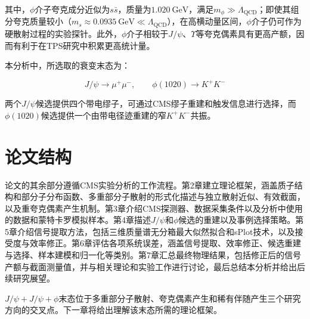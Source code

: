 其中，$\phi$介子夸克成分近似为$s\bar{s}$，质量为$\SI{1.020}{\giga\eV}$，满足$m_{\phi} \gg \Lambda_{\mathrm{QCD}}$；即使其组分夸克质量较小（$m_{s} \approx \SI{0.0935}{\giga\eV} \ll \Lambda_{\mathrm{QCD}}$），在高横动量区间，$\phi$介子仍可作为硬散射过程的实验探针。此外，$\phi$介子相较于$J/\psi$、$\Upsilon$等夸克偶素具有更高产额，因而有利于在TPS研究中积累更高统计量。

本分析中，所选取的衰变末态为：

\begin{equation*}
    J/\psi \to \mu^+\mu^-,
    \qquad
    \phi(1020) \to K^+K^-
\end{equation*}

两个$J/\psi$候选提供四个带电缪子，可通过CMS缪子重建和触发信息进行选择，而$\phi(1020)$候选提供一个由带电径迹重建的窄$K^+K^-$共振。

\section{论文结构}


论文的其余部分遵循CMS实验分析的工作流程。第2章建立理论框架，涵盖质子结构和部分子分布函数、多重部分子散射的形式化描述与独立散射近似、有效截面，以及重夸克偶素产生机制。第3章介绍CMS探测器、数据采集条件以及分析中使用的数据和蒙特卡罗模拟样本。第4章描述$J/\psi$和$\phi$候选的重建以及事例选择策略。第5章介绍信号提取方法，包括三维质量谱无分箱最大似然拟合和sPlot技术，以及接受度与效率修正。第6章评估各项系统误差，涵盖信号提取、效率修正、候选重建与选择、样本建模和归一化等类别。第7章汇总最终物理结果，包括修正后的信号产额与截面测量值，并与相关理论和实验工作进行讨论，最后总结本分析并给出后续研究展望。

$J/\psi+J/\psi+\phi$末态位于多重部分子散射、夸克偶素产生和稀有伴随产生三个研究方向的交叉点。下一章将给出理解该末态所需的理论框架。
